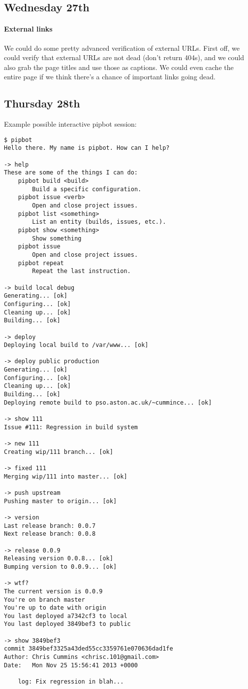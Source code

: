 \subsection{Wednesday 27th}
\paragraph{External links} We could do some pretty advanced verification of
external URLs. First off, we could verify that external URLs are not dead (don't
return 404s), and we could also grab the page titles and use those as
captions. We could even cache the entire page if we think there's a chance of
important links going dead.

\subsection{Thursday 28th}
Example possible interactive pipbot session:

\begin{verbatim}
$ pipbot
Hello there. My name is pipbot. How can I help?

-> help
These are some of the things I can do:
    pipbot build <build>
        Build a specific configuration.
    pipbot issue <verb>
        Open and close project issues.
    pipbot list <something>
        List an entity (builds, issues, etc.).
    pipbot show <something>
        Show something
    pipbot issue
        Open and close project issues.
    pipbot repeat
        Repeat the last instruction.

-> build local debug
Generating... [ok]
Configuring... [ok]
Cleaning up... [ok]
Building... [ok]

-> deploy
Deploying local build to /var/www... [ok]

-> deploy public production
Generating... [ok]
Configuring... [ok]
Cleaning up... [ok]
Building... [ok]
Deploying remote build to pso.aston.ac.uk/~cummince... [ok]

-> show 111
Issue #111: Regression in build system

-> new 111
Creating wip/111 branch... [ok]

-> fixed 111
Merging wip/111 into master... [ok]

-> push upstream
Pushing master to origin... [ok]

-> version
Last release branch: 0.0.7
Next release branch: 0.0.8

-> release 0.0.9
Releasing version 0.0.8... [ok]
Bumping version to 0.0.9... [ok]

-> wtf?
The current version is 0.0.9
You're on branch master
You're up to date with origin
You last deployed a7342cf3 to local
You last deployed 3849bef3 to public

-> show 3849bef3
commit 3849bef3325a43ded55cc3359761e070636dad1fe
Author: Chris Cummins <chrisc.101@gmail.com>
Date:   Mon Nov 25 15:56:41 2013 +0000

    log: Fix regression in blah...
\end{verbatim}

